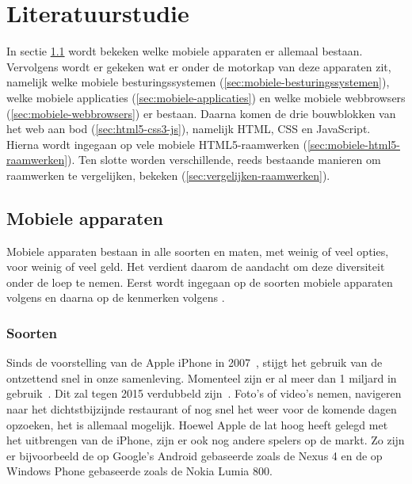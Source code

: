\chapter{Literatuurstudie}
\label{chap:literatuurstudie}
In sectie \ref{sec:mobiele-apparaten} wordt bekeken welke mobiele apparaten er allemaal bestaan. 
Vervolgens wordt er gekeken wat er onder de motorkap van deze apparaten zit, namelijk welke mobiele besturingssystemen (\ref{sec:mobiele-besturingssystemen}), welke mobiele applicaties (\ref{sec:mobiele-applicaties}) en welke mobiele webbrowsers (\ref{sec:mobiele-webbrowsers}) er bestaan. 
Daarna komen de drie bouwblokken van het web aan bod (\ref{sec:html5-css3-js}), namelijk HTML, CSS en JavaScript.
Hierna wordt ingegaan op vele mobiele HTML5-raamwerken (\ref{sec:mobiele-html5-raamwerken}).  
Ten slotte worden verschillende, reeds bestaande manieren om raamwerken te vergelijken, bekeken (\ref{sec:vergelijken-raamwerken}).


\section{Mobiele apparaten}
\label{sec:mobiele-apparaten}
Mobiele apparaten bestaan in alle soorten en maten, met weinig of veel opties, voor weinig of veel geld. 
Het verdient daarom de aandacht om deze diversiteit onder de loep te nemen. 
Eerst wordt ingegaan op de soorten mobiele apparaten volgens \cite{GCF2013} en daarna op de kenmerken volgens \cite{PhilDutson2012}.

\subsection{Soorten}
Sinds de voorstelling van de Apple iPhone in 2007~\cite{David2011}, stijgt het gebruik van de  ontzettend snel in onze samenleving.  
Momenteel zijn er al meer dan 1 miljard  in gebruik~\cite{Yang2012}. 
Dit zal tegen 2015 verdubbeld zijn~\cite{Gillett2012}.
Foto's of video's nemen, navigeren naar het dichtstbijzijnde restaurant of nog snel het weer voor de komende dagen opzoeken, het is allemaal mogelijk. 
Hoewel Apple de lat hoog heeft gelegd met het uitbrengen van de iPhone, zijn er ook nog andere spelers op de markt. 
Zo zijn er bijvoorbeeld de op Google's Android gebaseerde  zoals de Nexus 4 en de op Windows Phone gebaseerde  zoals de Nokia Lumia 800.

